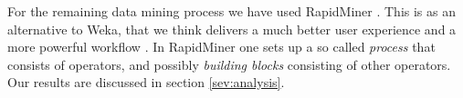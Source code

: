 For the remaining data mining process we have used RapidMiner \cite{rapidminer}. This is as an alternative to Weka, that we think delivers a much better user experience and a more powerful workflow \cite{weka}. In RapidMiner one sets up a so called \textit{process} that consists of operators, and possibly \textit{building blocks} consisting of other operators. Our results are discussed in section \ref{sev:analysis}.





